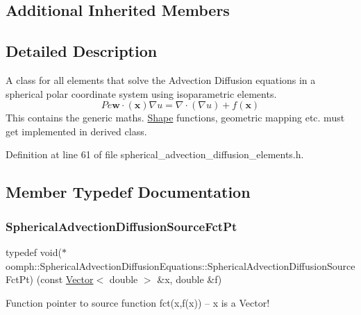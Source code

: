 \subsection*{Additional Inherited Members}


\subsection{Detailed Description}
A class for all elements that solve the Advection Diffusion equations in a spherical polar coordinate system using isoparametric elements. \[ Pe \mathbf{w}\cdot(\mathbf{x}) \nabla u = \nabla \cdot \left( \nabla u \right) + f(\mathbf{x}) \] This contains the generic maths. \hyperlink{classoomph_1_1Shape}{Shape} functions, geometric mapping etc. must get implemented in derived class. 

Definition at line 61 of file spherical\+\_\+advection\+\_\+diffusion\+\_\+elements.\+h.



\subsection{Member Typedef Documentation}
\mbox{\label{classoomph_1_1SphericalAdvectionDiffusionEquations_aa02d787c43f88e46ad5e21c7b299b5cb}} 
\subsubsection{\texorpdfstring{Spherical\+Advection\+Diffusion\+Source\+Fct\+Pt}{SphericalAdvectionDiffusionSourceFctPt}}
{\footnotesize\ttfamily typedef void($\ast$ oomph\+::\+Spherical\+Advection\+Diffusion\+Equations\+::\+Spherical\+Advection\+Diffusion\+Source\+Fct\+Pt) (const \hyperlink{classoomph_1_1Vector}{Vector}$<$ double $>$ \&x, double \&f)}



Function pointer to source function fct(x,f(x)) -- x is a Vector! 



